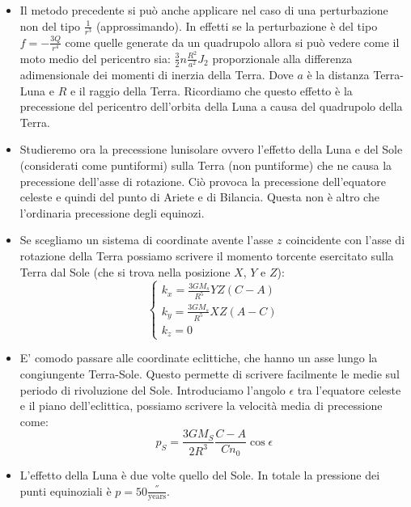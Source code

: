 \documentclass[11pt,a4paper]{article}
\begin{document}
\begin{itemize}
\item Il metodo precedente si può anche applicare nel caso di una perturbazione non del tipo $\frac{1}{r^3}$ (approssimando). In effetti se la perturbazione è del tipo $f =-\frac{3 Q}{r^4}$ come quelle generate da un quadrupolo allora si può vedere come il moto medio del pericentro sia: $\frac{3}{2} n \frac{R^2}{a^2} J_2$ proporzionale alla differenza adimensionale dei momenti di inerzia della Terra. Dove $a$ è la distanza Terra-Luna e $R$ e il raggio della Terra. Ricordiamo che questo effetto è la precessione del pericentro dell'orbita della Luna a causa del quadrupolo della Terra.

\item Studieremo ora la precessione lunisolare ovvero l'effetto della Luna e del Sole (considerati come puntiformi) sulla Terra (non puntiforme) che ne causa la precessione dell'asse di rotazione. Ciò provoca la precessione dell'equatore celeste e quindi del punto di Ariete e di Bilancia. Questa non è altro che l'ordinaria precessione degli equinozi.

\item Se scegliamo un sistema di coordinate avente l'asse $z$ coincidente con l'asse di rotazione della Terra possiamo scrivere il momento torcente esercitato sulla Terra dal Sole (che si trova nella posizione $X$, $Y$ e $Z$):
\begin{equation}
\begin{cases}
k_x = \frac{3 G M_s}{R^5} YZ \left( C - A \right) \\
k_y = \frac{3 G M_s}{R^5} XZ \left( A - C \right) \\
k_z = 0
\end{cases}
\end{equation}

\item E' comodo passare alle coordinate eclittiche, che hanno un asse lungo la congiungente Terra-Sole. Questo permette di scrivere facilmente le medie sul periodo di rivoluzione del Sole. Introduciamo l'angolo $\epsilon$ tra l'equatore celeste e il piano dell'eclittica, possiamo scrivere la velocità media di precessione come:
\begin{equation}
p_{S} = \frac{3 G M_S}{2 R^3} \frac{C-A}{C n_0} \cos \epsilon
\end{equation}

\item L'effetto della Luna è due volte quello del Sole. In totale la pressione dei punti equinoziali è $p = 50\frac{''}{\text{years}}$.


\end{itemize}
\end{document}
